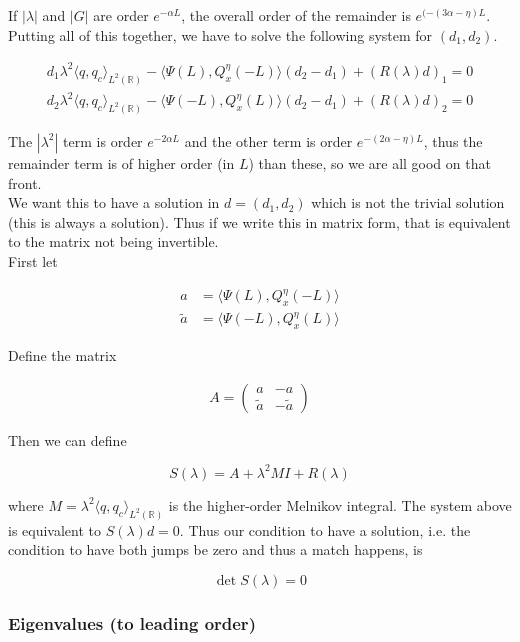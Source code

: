\documentclass[12pt]{article}
\def\R{{\mathbb R}}
\begin{document}
If $|\lambda|$ and $|G|$ are order $e^{-\alpha L}$, the overall order of the remainder is $e^{(-(3 \alpha - \eta)L}$.\\

Putting all of this together, we have to solve the following system for $(d_1, d_2)$.

\begin{align*}
d_1 \lambda^2 \langle q, q_c \rangle_{L^2(\R)} - \langle \Psi(L), Q^\eta_x(-L) \rangle (d_2 - d_1)  + (R(\lambda)d)_1 = 0\\
d_2 \lambda^2 \langle q, q_c \rangle_{L^2(\R)} - \langle \Psi(-L), Q^\eta_x(L) \rangle (d_2 - d_1)  + (R(\lambda)d)_2 = 0
\end{align*}

The $|\lambda^2|$ term is order $e^{-2 \alpha L}$ and the other term is order $e^{-(2 \alpha - \eta) L}$, thus the remainder term is of higher order (in $L$) than these, so we are all good on that front.\\

We want this to have a solution in $d = (d_1, d_2)$ which is not the trivial solution (this is always a solution). Thus if we write this in matrix form, that is equivalent to the matrix not being invertible.\\

First let

\begin{align*}
a &= \langle \Psi(L), Q^\eta_x(-L) \rangle \\
\tilde{a} &= \langle \Psi(-L), Q^\eta_x(L) \rangle
\end{align*}

Define the matrix

\begin{align*}
A = \begin{pmatrix}
a & -a \\ \tilde{a} & -\tilde{a} 
\end{pmatrix}
\end{align*}

Then we can define

\[
S(\lambda) = A + \lambda^2 MI + R(\lambda) 
\]

where $M = \lambda^2 \langle q, q_c \rangle_{L^2(\R)}$ is the higher-order Melnikov integral. The system above is equivalent to $S(\lambda)d = 0$. Thus our condition to have a solution, i.e. the condition to have both jumps be zero and thus a match happens, is

\[
\det S(\lambda) = 0
\]

\subsubsection*{Eigenvalues (to leading order)}
\end{document}
